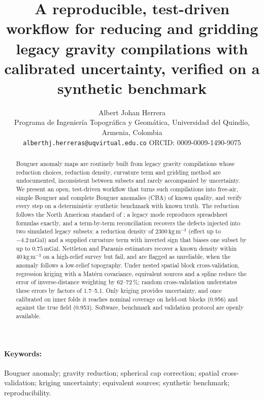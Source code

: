 \documentclass[11pt,a4paper]{article}
\title{A reproducible, test-driven workflow for reducing and gridding legacy gravity compilations with calibrated uncertainty, verified on a synthetic benchmark}
\author{Albert Johan Herrera\\[2pt]
\small Programa de Ingenier\'ia Topogr\'afica y Geom\'atica, Universidad del Quind\'io, Armenia, Colombia\\
\small \texttt{alberthj.herreras@uqvirtual.edu.co} \quad ORCID: 0009-0009-1490-9075}
\date{}
\newcommand{\mgal}{\ensuremath{\,\mathrm{mGal}}}
\newcommand{\kgm}{\ensuremath{\,\mathrm{kg\,m^{-3}}}}
\begin{document}
\maketitle
\linenumbers
\onehalfspacing

\begin{abstract}
Bouguer anomaly maps are routinely built from legacy gravity compilations whose reduction choices, reduction density, curvature term and gridding method are undocumented, inconsistent between subsets and rarely accompanied by uncertainty. We present an open, test-driven workflow that turns such compilations into free-air, simple Bouguer and complete Bouguer anomalies (CBA) of known quality, and verify every step on a deterministic synthetic benchmark with known truth. The reduction follows the North American standard of \citet{Hinze2005}; a legacy mode reproduces spreadsheet formulas exactly, and a term-by-term reconciliation recovers the defects injected into two simulated legacy subsets: a reduction density of $2300\kgm$ (effect up to $-4.2\mgal$) and a supplied curvature term with inverted sign that biases one subset by up to $0.75\mgal$. Nettleton and Parasnis estimators recover a known density within $40\kgm$ on a high-relief survey but fail, and are flagged as unreliable, when the anomaly follows a low-relief topography. Under nested spatial block cross-validation, regression kriging with a Mat\'ern covariance, equivalent sources and a spline reduce the error of inverse-distance weighting by 62--72\,\%; random cross-validation understates these errors by factors of 1.7--5.1. Only kriging provides uncertainty, and once calibrated on inner folds it reaches nominal coverage on held-out blocks (0.956) and against the true field (0.953). Software, benchmark and validation protocol are openly available.
\end{abstract}

\paragraph{Keywords:} Bouguer anomaly; gravity reduction; spherical cap correction; spatial cross-validation; kriging uncertainty; equivalent sources; synthetic benchmark; reproducibility.
\end{document}
